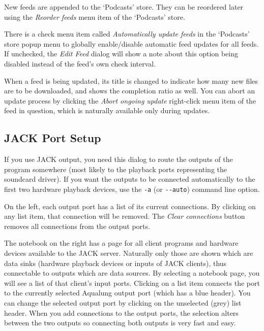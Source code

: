 \documentclass[10pt,english]{article}
\begin{document}
New feeds are appended to the `Podcasts' store.
They can be reordered later using the \textsl{Reorder
feeds} menu item of the `Podcasts' store.




There is a check menu item called \textsl{Automatically
update feeds} in the `Podcasts' store popup menu
to globally enable/disable automatic feed updates for all
feeds. If unchecked, the \textsl{Edit Feed} dialog will
show a note about this option being disabled instead of the
feed's own check interval.




When a feed is being updated, its title is changed to
indicate how many new files are to be downloaded, and shows
the completion ratio as well. You can abort an update
process by clicking the \textsl{Abort ongoing update}
right-click menu item of the feed in question, which is
naturally available only during updates.






\subsection{JACK Port Setup\label{idp612496}}



\noindent If you use JACK output, you need this dialog to route the
outputs of the program somewhere (most likely to the playback
ports representing the soundcard driver). If you want the
outputs to be connected automatically to the first two
hardware playback devices, use the \texttt{-a} (or
\texttt{{-}{-}auto}) command line option.




On the left, each output port has a list of its current
connections. By clicking on any list item, that connection
will be removed. The \textsl{Clear connections} button
removes all connections from the output ports.




The notebook on the right has a page for all client
programs and hardware devices available to the JACK
server. Naturally only those are shown which are data sinks
(hardware playback devices or inputs of JACK clients), thus
connectable to outputs which are data sources. By selecting a
notebook page, you will see a list of that client's input
ports. Clicking on a list item connects the port to the
currently selected Aqualung output port (which has a blue
header). You can change the selected output port by clicking
on the unselected (grey) list header. When you add connections
to the output ports, the selection alters between the two
outputs so connecting both outputs is very fast and easy.
\end{document}

